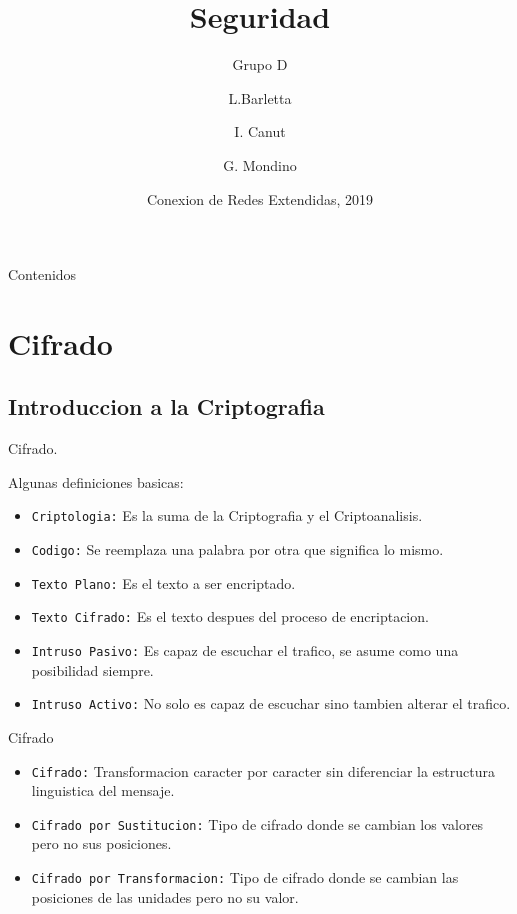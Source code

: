 \documentclass{beamer}
\title[Seguridad ]
{Seguridad}
\subtitle
{Grupo D}
\author[Author, Another, Another1] %
{L.Barletta\inst{1}  \and I. Canut\inst{2} \and G. Mondino\inst{3}}
\institute[I.P.S] %
{
  Instituto Politecnico Superior\\
 Gral. San Martin
}
\date
{Conexion de Redes Extendidas, 2019}
\begin{document}
\begin{frame}
  \titlepage
\end{frame}

\begin{frame}{Contenidos}
  \tableofcontents

\end{frame}

\section{Cifrado}
\subsection{Introduccion a la Criptografia}

\begin{frame}{Cifrado.} 

Algunas definiciones basicas:
  \begin{itemize}
 \item
    \texttt{Criptologia:} Es la suma de la Criptografia y el  Criptoanalisis.  
 \item
    \texttt{Codigo:} Se reemplaza una palabra por otra que significa lo mismo.
\item
    \texttt{Texto Plano:} Es el texto a ser encriptado.
  \item
    \texttt{Texto Cifrado:} Es el texto despues del proceso de encriptacion.
 \item
    \texttt{Intruso Pasivo:} Es capaz de escuchar el trafico, se asume como una posibilidad siempre.
 \item
    \texttt{Intruso Activo:} No solo es capaz de escuchar sino tambien alterar el trafico.
  \end{itemize}

\end{frame}

\begin{frame}{Cifrado} 

    \begin{itemize}
   \item
    \texttt{Cifrado:} Transformacion caracter por caracter sin diferenciar la estructura linguistica del mensaje.  
 \item
    \texttt{Cifrado por Sustitucion:} Tipo de cifrado donde se cambian los valores pero no sus posiciones. 
\item
    \texttt{Cifrado por Transformacion:}  Tipo de cifrado donde se cambian las posiciones de las unidades pero no su valor. 
    \end{itemize}
  
\end{frame}
\end{document}
